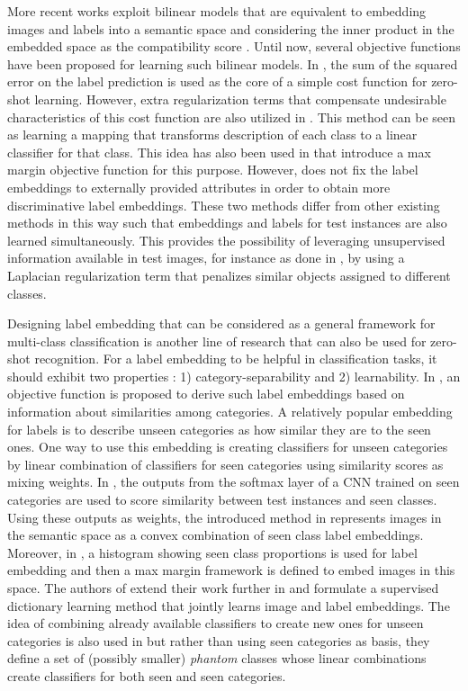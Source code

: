 \documentclass[10pt,twocolumn,letterpaper]{article}
\begin{document}
More recent works exploit bilinear models that are equivalent to embedding images and labels into a
semantic space and considering the inner product in the embedded space as the compatibility score \cite{Yu2013, devise, convex, sse, emb15,semi15}.
Until now, several objective functions have been proposed for learning such bilinear models.
In \cite{emb15}, the sum of the squared error on the label prediction is used as the core of a simple cost function for zero-shot learning. However, extra regularization terms that compensate undesirable characteristics of this cost function are also utilized in \cite{emb15}.
This method can be seen as learning a mapping that transforms description of each class to a linear classifier for that class. This idea has also been used in \cite{li15max, semi15} that introduce a max margin objective function for this purpose.
However, \cite{semi15} does not fix the label embeddings to externally provided attributes in order to obtain more discriminative label embeddings. These two methods
differ from other existing methods in this way such that embeddings and labels for test instances are also learned simultaneously. This provides the possibility of
leveraging unsupervised information available in test images, for instance as done in \cite{semi15}, by using a Laplacian regularization term that penalizes similar objects assigned to different classes.

Designing label embedding that can be considered as a general framework for multi-class classification is another line of research that can also be used for zero-shot recognition. For a label embedding to be helpful in classification tasks,
 it should exhibit two properties \cite{Yu2013}: 1) category-separability and 2) learnability. In \cite{Yu2013}, an objective function is proposed to derive such label embeddings based on information about similarities among categories.
A relatively popular embedding for labels is to describe unseen categories as how similar they are to the seen ones.
One way to use this embedding is creating classifiers for unseen categories by linear combination of
classifiers for seen categories using similarity scores as mixing weights.
In \cite{convex}, the outputs from the softmax layer of a CNN trained on seen categories are used to score similarity between test instances and seen classes.
Using these outputs as weights, the introduced method in \cite{convex} represents images in the semantic space as a convex combination of seen class label embeddings.
Moreover, in \cite{sse}, a histogram showing seen class proportions is used for label embedding and then a max margin framework is defined to embed images in this space. The authors of \cite{convex} extend their work further in \cite{agnostic} and formulate a supervised dictionary learning method that jointly learns image and label embeddings.
 The idea of combining already available classifiers to create new ones for unseen categories is also used in \cite{Synthesized}
 but rather than using seen categories as basis, they define a set of (possibly smaller) \textit{phantom} classes whose linear combinations
 create classifiers for both seen and seen categories.
\end{document}
